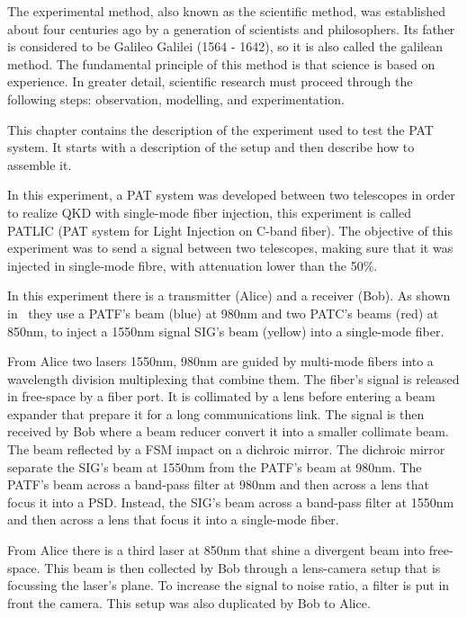 The experimental method, also known as the scientific method, was established about four centuries ago by a generation of scientists and philosophers. Its father is considered to be Galileo Galilei (1564 - 1642), so it is also called the galilean method.
The fundamental principle of this method is that science is based on experience.
In greater detail, scientific research must proceed through the following steps: observation, modelling, and experimentation.

This chapter contains the description of the experiment used to test the PAT system. It starts with a description of the setup and then describe how to assemble it.


In this experiment, a PAT system was developed between two telescopes in order to realize QKD with single-mode fiber injection, this experiment is called PATLIC (PAT system for Light Injection on C-band fiber).
The objective of this experiment was to send a signal between two telescopes, making sure that it was injected in single-mode fibre, with attenuation lower than the 50\%.

In this experiment there is a transmitter (Alice) and a receiver (Bob). As shown in~ they use a PATF's beam (blue) at 980nm and two PATC's beams (red) at 850nm, to inject a 1550nm signal SIG's beam (yellow) into a single-mode fiber.

From Alice two lasers 1550nm, 980nm are guided by multi-mode fibers into a wavelength division multiplexing that combine them. The fiber's signal is released in free-space by a fiber port. It is collimated by a lens before entering a beam expander that prepare it for a long communications link. The signal is then received by Bob where a beam reducer convert it into a smaller collimate beam. The beam reflected by a FSM impact on a dichroic mirror. The dichroic mirror separate the SIG's beam at 1550nm from the PATF's beam at 980nm. The PATF's beam across a band-pass filter at 980nm and then across a lens that focus it into a PSD. Instead, the SIG's beam across a band-pass filter at 1550nm and then across a lens that focus it into a single-mode fiber.

From Alice there is a third laser at 850nm that shine a divergent beam into free-space. This beam is then collected by Bob through a lens-camera setup that is focussing the laser's plane. To increase the signal to noise ratio, a filter is put in front the camera. This setup was also duplicated by Bob to Alice.

